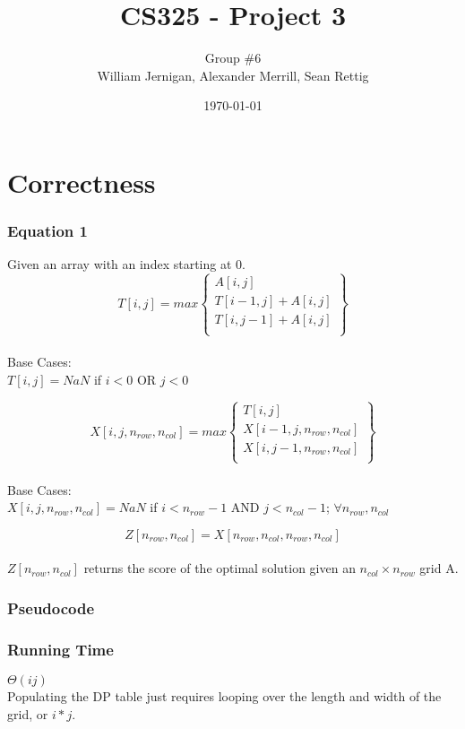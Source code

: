 \documentclass{article}
\title{CS325 - Project 3}
\author{Group \#6 \\ William Jernigan, Alexander Merrill, Sean Rettig}
\date{\today}
\begin{document}
\maketitle

\part*{Correctness}
\section*{Equation 1}
Given an array with an index starting at 0.\\

\[ T[i,j] = max \left\{ \begin{array}{ll}
    A[i,j]\\
    T[i-1,j] + A[i,j]\\
    T[i,j-1] + A[i,j]\\\end{array} \right\} \] \\
Base Cases:\\
$T[i,j] = NaN$ if $i < 0$ OR $j < 0$

\[ X[i,j,n_{row},n_{col}] = max \left\{ \begin{array}{ll}
    T[i,j]\\
    X[i-1,j,n_{row},n_{col}]\\
    X[i,j-1,n_{row},n_{col}]\\\end{array} \right\} \] \\
Base Cases:\\
$X[i,j,n_{row},n_{col}] = NaN$ if $i < n_{row}-1$ AND $j < n_{col}-1$; $\forall n_{row},n_{col}$

\[ Z[n_{row},n_{col}] = X[n_{row},n_{col},n_{row},n_{col}] \] \\
$Z[n_{row},n_{col}]$ returns the score of the optimal solution given an $n_{col} \times n_{row}$ grid A.


\section*{Pseudocode}


\section*{Running Time}
$\Theta(ij)$\\
Populating the DP table just requires looping over the length and width of the grid, or $i * j$.
\end{document}
